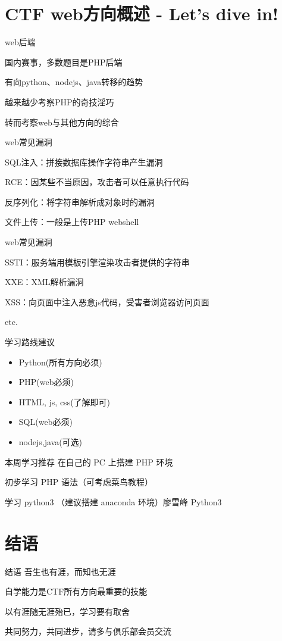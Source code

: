 \documentclass[UTF8]{ctexbeamer}
\begin{document}
\section{CTF web方向概述 - Let's dive in!}
\begin{frame}{web后端}
    
    国内赛事，多数题目是PHP后端
    
    有向python、nodejs、java转移的趋势
    
    越来越少考察PHP的奇技淫巧
    
    转而考察web与其他方向的综合

\end{frame}
\begin{frame}{web常见漏洞}
    
    SQL注入：拼接数据库操作字符串产生漏洞
    
    RCE：因某些不当原因，攻击者可以任意执行代码
    
    反序列化：将字符串解析成对象时的漏洞
    
    文件上传：一般是上传PHP webshell

\end{frame}
\begin{frame}{web常见漏洞}
    
    SSTI：服务端用模板引擎渲染攻击者提供的字符串
    
    XXE：XML解析漏洞
    
    XSS：向页面中注入恶意js代码，受害者浏览器访问页面
    
    etc.

\end{frame}

\begin{frame}{学习路线建议}
    \begin{itemize}
        \item Python(所有方向必须)
        \item PHP(web必须)
        \item HTML, js, css(了解即可)
        \item SQL(web必须)
        \item nodejs,java(可选)
    \end{itemize}
\end{frame}
\begin{frame}{本周学习推荐}
    在自己的 PC 上搭建 PHP 环境
    
    初步学习 PHP 语法（可考虑菜鸟教程）
    
    学习 python3 （建议搭建 anaconda 环境）廖雪峰 Python3 

\end{frame}

\section{结语}
\begin{frame}{结语}
    吾生也有涯，而知也无涯
    
    自学能力是CTF所有方向最重要的技能
    
    以有涯随无涯殆已，学习要有取舍
    
    共同努力，共同进步，请多与俱乐部会员交流
\end{frame}
\end{document}
